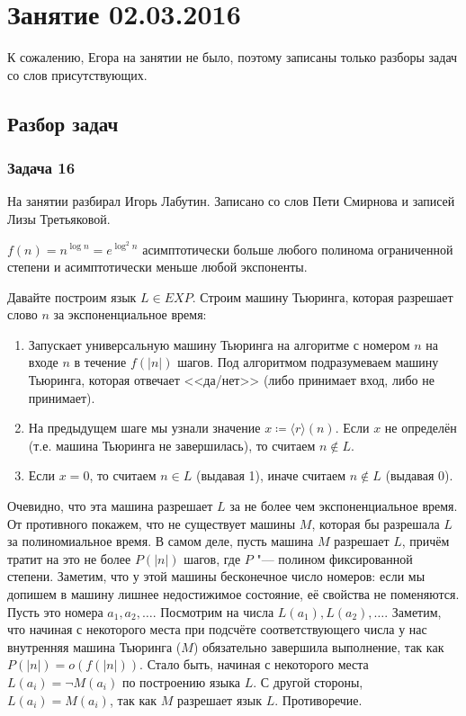 \chapter{Занятие 02.03.2016}

К сожалению, Егора на занятии не было, поэтому записаны только разборы задач
со слов присутствующих.

\section{Разбор задач}
\subsection{Задача 16}
	На занятии разбирал Игорь Лабутин.
	Записано со слов Пети Смирнова и записей Лизы Третьяковой.

	\begin{assertion}
		$f(n)=n^{\log n}=e^{\log^2 n}$ асимптотически больше любого полинома ограниченной степени
		и асимптотически меньше любой экспоненты.
	\end{assertion}
	Давайте построим язык $L \in EXP$.
	Строим машину Тьюринга, которая разрешает слово $n$ за экспоненциальное время:
	\begin{enumerate}
		\item
			Запускает универсальную машину Тьюринга на алгоритме с номером $n$ на входе $n$ в течение $f(|n|)$ шагов.
			Под алгоритмом подразумеваем машину Тьюринга, которая отвечает <<да/нет>> (либо принимает вход, либо не принимает).
		\item
			На предыдущем шаге мы узнали значение $x \coloneq \langle r \rangle(n)$.
			Если $x$ не определён (т.е. машина Тьюринга не завершилась), то считаем $n \notin L$.
		\item
			Если $x=0$, то считаем $n \in L$ (выдавая 1), иначе считаем $n \notin L$ (выдавая 0).
	\end{enumerate}
	Очевидно, что эта машина разрешает $L$ за не более чем экспоненциальное время.
	От противного покажем, что не существует машины $M$, которая бы разрешала $L$ за полиномиальное время.
	В самом деле, пусть машина $M$ разрешает $L$, причём тратит на это не более $P(|n|)$ шагов,
	где $P$ "--- полином фиксированной степени.
	Заметим, что у этой машины бесконечное число номеров: если мы допишем в машину лишнее недостижимое состояние,
	её свойства не поменяются.
	Пусть это номера $a_1, a_2, \dots$.
	Посмотрим на числа $L(a_1), L(a_2), \dots$.
	Заметим, что начиная с некоторого места при подсчёте соответствующего числа у нас внутренняя машина Тьюринга ($M$)
	обязательно завершила выполнение, так как $P(|n|)=o(f(|n|))$.
	Стало быть, начиная с некоторого места $L(a_i)=\lnot M(a_i)$ по построению языка $L$.
	С другой стороны, $L(a_i)=M(a_i)$, так как $M$ разрешает язык $L$.
	Противоречие.

